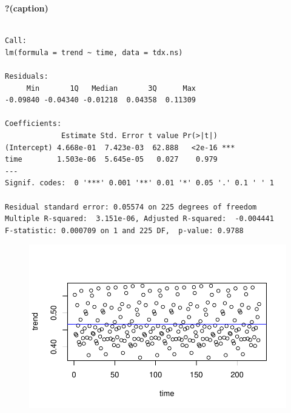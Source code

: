 \documentclass[
  onepage,
  openany]{scrbook}
\newenvironment{Shaded}{}{}
\newcommand{\AttributeTok}[1]{\textcolor[rgb]{0.49,0.56,0.16}{#1}}
\newcommand{\DecValTok}[1]{\textcolor[rgb]{0.25,0.63,0.44}{#1}}
\newcommand{\FunctionTok}[1]{\textcolor[rgb]{0.02,0.16,0.49}{#1}}
\newcommand{\NormalTok}[1]{#1}
\newcommand{\SpecialCharTok}[1]{\textcolor[rgb]{0.25,0.44,0.63}{#1}}
\newcommand{\StringTok}[1]{\textcolor[rgb]{0.25,0.44,0.63}{#1}}
\begin{document}
\begin{table}

\caption{\textbf{?(caption)}}\begin{minipage}[t]{\linewidth}

{\centering 

\begin{verbatim}

Call:
lm(formula = trend ~ time, data = tdx.ns)

Residuals:
     Min       1Q   Median       3Q      Max 
-0.09840 -0.04340 -0.01218  0.04358  0.11309 

Coefficients:
             Estimate Std. Error t value Pr(>|t|)    
(Intercept) 4.668e-01  7.423e-03  62.888   <2e-16 ***
time        1.503e-06  5.645e-05   0.027    0.979    
---
Signif. codes:  0 '***' 0.001 '**' 0.01 '*' 0.05 '.' 0.1 ' ' 1

Residual standard error: 0.05574 on 225 degrees of freedom
Multiple R-squared:  3.151e-06, Adjusted R-squared:  -0.004441 
F-statistic: 0.000709 on 1 and 225 DF,  p-value: 0.9788
\end{verbatim}

}

\end{minipage}%

\end{table}

\begin{Shaded}
\end{Shaded}

\begin{figure}[H]

{\centering \includegraphics{Quarto_files/figure-pdf/unnamed-chunk-13-1.pdf}

}

\end{figure}
\end{document}
